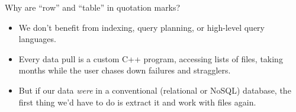 \documentclass[aspectratio=169]{beamer}
\begin{document}
\begin{frame}{Why are ``row'' and ``table'' in quotation marks?}
\vspace{0.75 cm}

\vspace{0.5 cm}
\begin{itemize}\setlength{\itemsep}{0.5 cm}
\item<3-> \large We don't benefit from indexing, query planning, or high-level query languages.
\item<4-> \large Every data pull is a custom C++ program, accessing lists of files, taking months while the user chases down failures and stragglers.
\item<5-> \large But if our data {\it were} in a conventional (relational or NoSQL) database, the first thing we'd have to do is extract it and work with files again.
\end{itemize}
\begin{center}
\huge {}
\end{center}
\end{frame}
\end{document}
